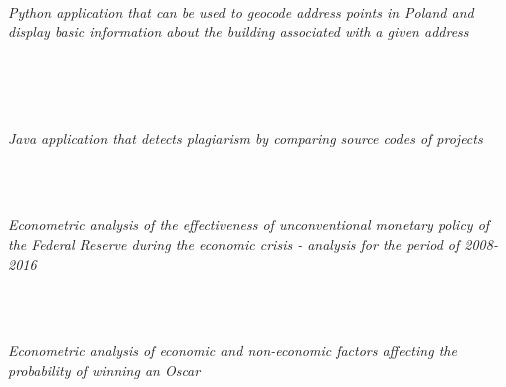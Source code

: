\documentclass{cls/gml_cv_sets}
\begin{document}
\begin{paracol}{2}
{{ %
 \\ 

\textit{\footnotesize Python application that can be used to geocode address 
points in Poland and display basic information about the building associated 
with a given address} \\ \vspace{-0.75em}

 \\
 \\ \vspace{0.6em}

 \\

\textit{\footnotesize Java application that detects plagiarism by comparing 
source codes of projects} \\ \vspace{-0.75em}

 \\ \vspace{0.6em}

 \\ 

\textit{\footnotesize Econometric analysis of the effectiveness of 
unconventional monetary policy of the Federal Reserve during the economic 
crisis - analysis for the period of 2008-2016} \\ \vspace{-0.75em}

 \\ \vspace{0.6em}

 \\ 

\textit{\footnotesize Econometric analysis of economic and non-economic 
factors affecting the probability of winning an Oscar} \\ \vspace{-0.75em}

}}
\end{paracol}
\end{document}
